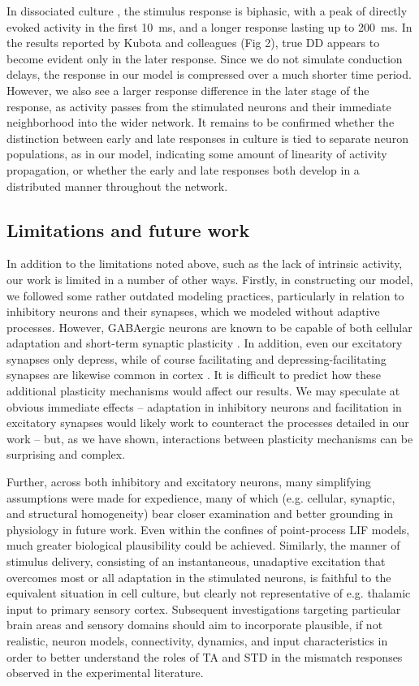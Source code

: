 \documentclass[10pt,letterpaper]{article}
\begin{document}
In dissociated culture \cite{Kubota2021-dx}, the stimulus response is biphasic, with a peak of directly evoked activity in the first \qty{10}{\milli\second}, and a longer response lasting up to \qty{200}{\milli\second}. In the results reported by Kubota and colleagues (Fig 2), true DD appears to become evident only in the later response. Since we do not simulate conduction delays, the response in our model is compressed over a much shorter time period. However, we also see a larger response difference in the later stage of the response, as activity passes from the stimulated neurons and their immediate neighborhood into the wider network. It remains to be confirmed whether the distinction between early and late responses in culture is tied to separate neuron populations, as in our model, indicating some amount of linearity of activity propagation, or whether the early and late responses both develop in a distributed manner throughout the network.

\subsection*{Limitations and future work}

In addition to the limitations noted above, such as the lack of intrinsic activity, our work is limited in a number of other ways.
Firstly, in constructing our model, we followed some rather outdated modeling practices, particularly in relation to inhibitory neurons and their synapses, which we modeled without adaptive processes. However, GABAergic neurons are known to be capable of both cellular adaptation and short-term synaptic plasticity \cite{Perrenoud2013-fo,Markram2004-fb,Gupta2000-jh}. In addition, even our excitatory synapses only depress, while of course facilitating and depressing-facilitating synapses are likewise common in cortex \cite{Tsodyks1997-qt,Varela1997-nr}. It is difficult to predict how these additional plasticity mechanisms would affect our results. We may speculate at obvious immediate effects -- adaptation in inhibitory neurons and facilitation in excitatory synapses would likely work to counteract the processes detailed in our work -- but, as we have shown, interactions between plasticity mechanisms can be surprising and complex.

Further, across both inhibitory and excitatory neurons, many simplifying assumptions were made for expedience, many of which (e.g. cellular, synaptic, and structural homogeneity) bear closer examination and better grounding in physiology in future work. Even within the confines of point-process LIF models, much greater biological plausibility could be achieved.
Similarly, the manner of stimulus delivery, consisting of an instantaneous, unadaptive excitation that overcomes most or all adaptation in the stimulated neurons, is faithful to the equivalent situation in cell culture, but clearly not representative of e.g. thalamic input to primary sensory cortex.
Subsequent investigations targeting particular brain areas and sensory domains should aim to incorporate plausible, if not realistic, neuron models, connectivity, dynamics, and input characteristics in order to better understand the roles of TA and STD in the mismatch responses observed in the experimental literature.
\end{document}
